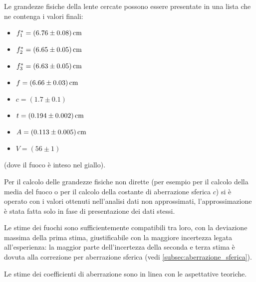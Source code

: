 Le grandezze fisiche della lente cercate possono essere presentate in una lista che ne contenga i valori finali:
\begin{itemize}
\item $f^*_1 = (6.76 \pm 0.08) \,\mathrm{cm}$
\item $f^*_2 = (6.65 \pm 0.05) \,\mathrm{cm}$
\item $f^*_3 = (6.63 \pm 0.05) \,\mathrm{cm}$
\item $f = (6.66 \pm 0.03) \,\mathrm{cm}$
\item $c = (1.7 \pm 0.1)$
\item $t = (0.194 \pm 0.002) \,\mathrm{cm}$
\item $A = (0.113 \pm 0.005) \,\mathrm{cm}$
\item $V = (56 \pm 1)$  
\end{itemize}
(dove il fuoco \`e inteso nel giallo).

Per il calcolo delle grandezze fisiche non dirette (per esempio per il calcolo della media del fuoco o per il calcolo della costante di aberrazione sferica $c$) si \`e operato con i valori ottenuti nell'analisi dati non approssimati, l'approssimazione \`e stata fatta solo in fase di presentazione dei dati stessi.

Le stime dei fuochi sono sufficientemente compatibili tra loro, con la deviazione massima della prima stima, giustificabile con la maggiore incertezza legata all'esperienza: la maggior parte dell'incertezza della seconda e terza stima \`e dovuta alla correzione per aberrazione sferica (vedi \autoref{subsec:aberrazione_sferica}).

Le stime dei coefficienti di aberrazione sono in linea con le aspettative teoriche.
